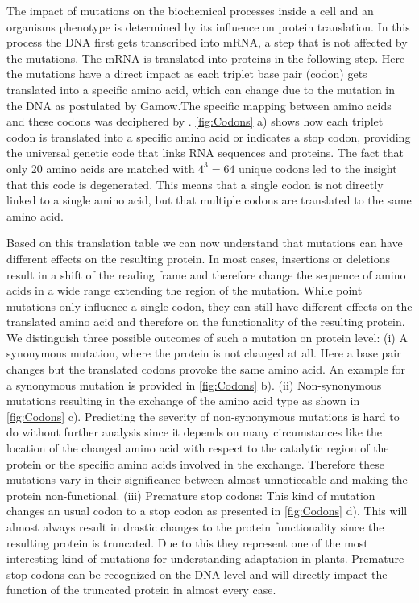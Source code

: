 The impact of mutations on the biochemical processes inside a cell and an organisms phenotype is determined by its influence on protein translation. In this process the DNA first gets transcribed into mRNA, a step that is not affected by the mutations. The mRNA is translated into proteins in the following step. Here the mutations have a direct impact as each triplet base pair (codon) gets translated into a specific amino acid, which can change due to the mutation in the DNA as postulated by Gamow\cite{crick1988}.The specific mapping between amino acids and these codons was deciphered by \textcite{Nirenberg1965}. \autoref{fig:Codons} a) shows how each triplet codon is translated into a specific amino acid or indicates a stop codon, providing the universal genetic code that links RNA sequences and proteins. The fact that only 20 amino acids are matched with $4^3 = 64$ unique codons led \textcite{Lagerkvist1978} to the insight that this code is degenerated. This means that a single codon is not directly linked to a single amino acid, but that multiple codons are translated to the same amino acid.

Based on this translation table we can now understand that mutations can have different effects on the resulting protein. In most cases, insertions or deletions result in a shift of the reading frame and therefore change the sequence of amino acids in a wide range extending the region of the mutation. While point mutations only influence a single codon, they can still have different effects on the translated amino acid and therefore on the functionality of the resulting protein. We distinguish three possible outcomes of such a mutation on protein level: (i) A synonymous mutation, where the protein is not changed at all. Here a base pair changes but the translated codons provoke the same amino acid. An example for a synonymous mutation is provided in \autoref{fig:Codons} b). (ii) Non-synonymous mutations resulting in the exchange of the amino acid type as shown in \autoref{fig:Codons} c). Predicting the severity of non-synonymous mutations is hard to do without further analysis since it depends on many circumstances like the location of the changed amino acid with respect to the catalytic region of the protein or the specific amino acids involved in the exchange. Therefore these mutations vary in their significance between almost unnoticeable and making the protein non-functional. (iii) Premature stop codons: This kind of mutation changes an usual codon to a stop codon as presented in \autoref{fig:Codons} d). This will almost always result in drastic changes to the protein functionality since the resulting protein is truncated. Due to this they represent one of the most interesting kind of mutations for understanding adaptation in plants. Premature stop codons can be recognized on the DNA level and will directly impact the function of the truncated protein in almost every case.

